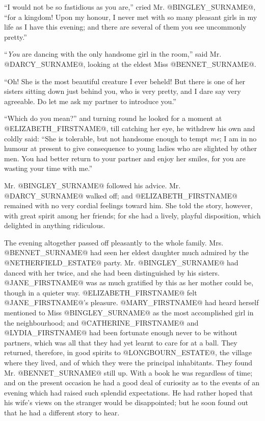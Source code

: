 ``I would not be so fastidious as you are,'' cried Mr. @BINGLEY_SURNAME@, ``for a
kingdom! Upon my honour, I never met with so many pleasant girls in
my life as I have this evening; and there are several of them you see
uncommonly pretty.''

``\textit{You} are dancing with the only handsome girl in the room,'' said Mr.
@DARCY_SURNAME@, looking at the eldest Miss @BENNET_SURNAME@.

``Oh! She is the most beautiful creature I ever beheld! But there is one
of her sisters sitting down just behind you, who is very pretty, and I
dare say very agreeable. Do let me ask my partner to introduce you.''

``Which do you mean?'' and turning round he looked for a moment at
@ELIZABETH_FIRSTNAME@, till catching her eye, he withdrew his own and coldly said:
``She is tolerable, but not handsome enough to tempt \textit{me}; I am in no
humour at present to give consequence to young ladies who are slighted
by other men. You had better return to your partner and enjoy her
smiles, for you are wasting your time with me.''

Mr. @BINGLEY_SURNAME@ followed his advice. Mr. @DARCY_SURNAME@ walked off; and @ELIZABETH_FIRSTNAME@
remained with no very cordial feelings toward him. She told the story,
however, with great spirit among her friends; for she had a lively,
playful disposition, which delighted in anything ridiculous.

The evening altogether passed off pleasantly to the whole family. Mrs.
@BENNET_SURNAME@ had seen her eldest daughter much admired by the @NETHERFIELD_ESTATE@
party. Mr. @BINGLEY_SURNAME@ had danced with her twice, and she had been
distinguished by his sisters. @JANE_FIRSTNAME@ was as much gratified by this as
her mother could be, though in a quieter way. @ELIZABETH_FIRSTNAME@ felt @JANE_FIRSTNAME@'s
pleasure. @MARY_FIRSTNAME@ had heard herself mentioned to Miss @BINGLEY_SURNAME@ as the most
accomplished girl in the neighbourhood; and @CATHERINE_FIRSTNAME@ and @LYDIA_FIRSTNAME@ had been
fortunate enough never to be without partners, which was all that they
had yet learnt to care for at a ball. They returned, therefore, in good
spirits to @LONGBOURN_ESTATE@, the village where they lived, and of which they
were the principal inhabitants. They found Mr. @BENNET_SURNAME@ still up. With
a book he was regardless of time; and on the present occasion he had a
good deal of curiosity as to the events of an evening which had raised
such splendid expectations. He had rather hoped that his wife's views on
the stranger would be disappointed; but he soon found out that he had a
different story to hear.

